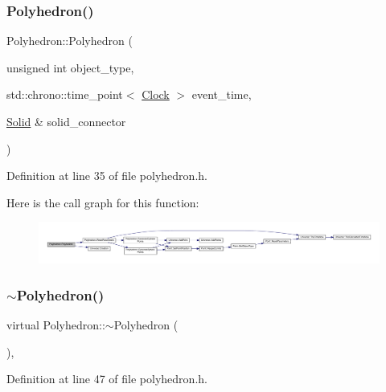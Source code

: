 \subsubsection{\texorpdfstring{Polyhedron()}{Polyhedron()}\hspace{0.1cm}{\footnotesize\ttfamily [4/4]}}
{\footnotesize\ttfamily Polyhedron\+::\+Polyhedron (\begin{DoxyParamCaption}\item[{unsigned int}]{object\+\_\+type,  }\item[{std\+::chrono\+::time\+\_\+point$<$ \hyperlink{universe_8h_a0ef8d951d1ca5ab3cfaf7ab4c7a6fd80}{Clock} $>$}]{event\+\_\+time,  }\item[{\hyperlink{class_solid}{Solid} \&}]{solid\+\_\+connector }\end{DoxyParamCaption})\hspace{0.3cm}{\ttfamily [inline]}}



Definition at line 35 of file polyhedron.\+h.

Here is the call graph for this function\+:
\nopagebreak
\begin{figure}[H]
\begin{center}
\leavevmode
\includegraphics[width=350pt]{class_polyhedron_af5bb1d2a6b04502dfdbfc9f04aafc950_cgraph}
\end{center}
\end{figure}
\mbox{\label{class_polyhedron_a3ad3df8be901a55ddcd97128ac890473}} 
\subsubsection{\texorpdfstring{$\sim$\+Polyhedron()}{~Polyhedron()}}
{\footnotesize\ttfamily virtual Polyhedron\+::$\sim$\+Polyhedron (\begin{DoxyParamCaption}{ }\end{DoxyParamCaption})\hspace{0.3cm}{\ttfamily [inline]}, {\ttfamily [virtual]}}



Definition at line 47 of file polyhedron.\+h.

